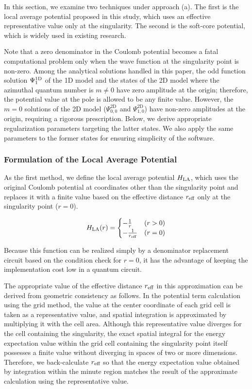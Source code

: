 \documentclass[jctc-draft.tex]{subfiles}
\begin{document}
In this section, we examine two techniques under approach (a). The first is the
local average potential proposed in this study, which uses an effective
representative value only at the singularity. The second is the soft-core
potential, which is widely used in existing research.

Note that a zero denominator in the Coulomb potential becomes a fatal
computational problem only when the wave function at the singularity point is
non-zero. Among the analytical solutions handled in this paper, the odd function
solution $\Psi^{\mathrm{1D}}_1$ of the 1D model and the states of the 2D model where the
azimuthal quantum number is $m \neq 0$ have zero amplitude at the origin;
therefore, the potential value at the pole is allowed to be any finite value.
However, the $m=0$ solutions of the 2D model ($\Psi_{0,0}^{\mathrm{2D}}$ and
$\Psi_{1,0}^{\mathrm{2D}}$) have non-zero amplitudes at the origin, requiring a
rigorous prescription. Below, we derive appropriate regularization parameters
targeting the latter states.  We also apply the same parameters to the former
states for ensuring simplicity of the software.

\subsubsection{Formulation of the Local Average Potential}
\label{subsubsec:formulation-of-local-average-potential}

As the first method, we define the local average potential $H_{\mathrm{LA}}$, which uses
the original Coulomb potential at coordinates other than the singularity point
and replaces it with a finite value based on the effective distance $r_{\mathrm{eff}}$ only
at the singularity point ($r=0$).

\begin{equation}
H_{\mathrm{LA}}(r) = \begin{cases}
-\frac{1}{r} & (r>0) \\
-\frac{1}{r_{\mathrm{eff}}} & (r=0)
\end{cases}\label{eq:Halr}
\end{equation}

Because this function can be realized simply by a denominator replacement
circuit based on the condition check for $r=0$, it has the advantage of keeping
the implementation cost low in a quantum circuit.

The appropriate value of the effective distance $r_{\mathrm{eff}}$ in this approximation
can be derived from geometric consistency as follows. In the potential term
calculation using the grid method, the value at the center coordinate of each
grid cell is taken as a representative value, and spatial integration is
approximated by multiplying it with the cell area. Although this representative
value diverges for the cell containing the singularity, the exact spatial
integral for the energy expectation value within the grid cell containing the
singularity point itself possesses a finite value without diverging in spaces of
two or more dimensions. Therefore, we back-calculate $r_{\mathrm{eff}}$ so that the energy
expectation value obtained by integration within the minute region matches the
result of the approximate calculation using the representative value.
\end{document}
